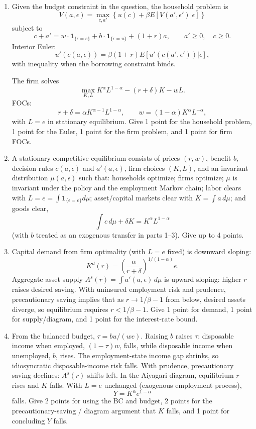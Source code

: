 \documentclass[11pt]{article}
\newcommand{\ben}{\begin{enumerate}}
\newcommand{\een}{\end{enumerate}}
\begin{document}
\ben
\item Given the budget constraint in the question, the household problem is
\[
V(a,\epsilon)=\max_{c,a'}\left\{
u(c)+\beta E[V(a',\epsilon')|\epsilon]
\right\}
\]
subject to
\[
c+a'=w\cdot\mathbf{1}_{\{\epsilon=e\}}+b\cdot\mathbf{1}_{\{\epsilon=u\}}+(1+r)a,
\qquad a'\geq 0,\quad c\geq 0.
\]
Interior Euler:
\[
u'(c(a,\epsilon))=\beta(1+r)E\left[u'(c(a',\epsilon'))|\epsilon\right],
\]
with inequality when the borrowing constraint binds.

The firm solves
\[
\max_{K,L} K^\alpha L^{1-\alpha}-(r+\delta)K-wL.
\]
FOCs:
\[
r+\delta=\alpha K^{\alpha-1}L^{1-\alpha},
\qquad
w=(1-\alpha)K^\alpha L^{-\alpha},
\]
with $L=e$ in stationary equilibrium. Give 1 point for the household problem, 1 point for the Euler, 1 point for the firm problem, and 1 point for firm FOCs.

\item A stationary competitive equilibrium consists of prices $(r,w)$, benefit $b$, decision rules $c(a,\epsilon)$ and $a'(a,\epsilon)$, firm choices $(K,L)$, and an invariant distribution $\mu(a,\epsilon)$ such that: households optimize; firms optimize; $\mu$ is invariant under the policy and the employment Markov chain; labor clears with $L=e=\int \mathbf{1}_{\{\epsilon=e\}}d\mu$; asset/capital markets clear with $K=\int a\,d\mu$; and goods clear,
\[
\int c\,d\mu+\delta K=K^\alpha L^{1-\alpha}
\]
(with $b$ treated as an exogenous transfer in parts 1--3). Give up to 4 points.

\item Capital demand from firm optimality (with $L=e$ fixed) is downward sloping:
\[
K^d(r)=\left(\frac{\alpha}{r+\delta}\right)^{1/(1-\alpha)}e.
\]
Aggregate asset supply $A^s(r)=\int a'(a,\epsilon)\,d\mu$ is upward sloping: higher $r$ raises desired saving. With uninsured employment risk and prudence, precautionary saving implies that as $r\to 1/\beta-1$ from below, desired assets diverge, so equilibrium requires $r<1/\beta-1$. Give 1 point for demand, 1 point for supply/diagram, and 1 point for the interest-rate bound.

\item From the balanced budget, $\tau = bu/(we)$. Raising $b$ raises $\tau$: disposable income when employed, $(1-\tau)w$, falls, while disposable income when unemployed, $b$, rises. The employment-state income gap shrinks, so idiosyncratic disposable-income risk falls. With prudence, precautionary saving declines: $A^s(r)$ shifts left. In the Aiyagari diagram, equilibrium $r$ rises and $K$ falls. With $L=e$ unchanged (exogenous employment process),
\[
Y=K^\alpha e^{1-\alpha}
\]
falls. Give 2 points for using the BC and budget, 2 points for the precautionary-saving / diagram argument that $K$ falls, and 1 point for concluding $Y$ falls.
\een
\end{document}
